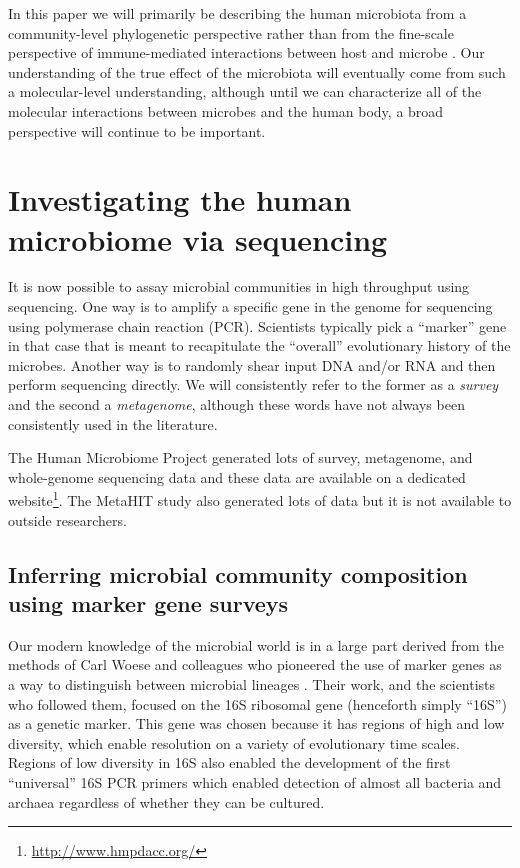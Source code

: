\documentclass{amsart}
\begin{document}
In this paper we will primarily be describing the human microbiota from a community-level phylogenetic perspective rather than from the fine-scale perspective of immune-mediated interactions between host and microbe \citep[reviewed in][]{hooper2012interactions}.
Our understanding of the true effect of the microbiota will eventually come from such a molecular-level understanding, although until we can characterize all of the molecular interactions between microbes and the human body, a broad perspective will continue to be important.


\section{Investigating the human microbiome via sequencing}
It is now possible to assay microbial communities in high throughput using sequencing.
One way is to amplify a specific gene in the genome for sequencing using polymerase chain reaction (PCR).
Scientists typically pick a ``marker'' gene in that case that is meant to recapitulate the ``overall'' evolutionary history of the microbes.
Another way is to randomly shear input DNA and/or RNA and then perform sequencing directly.
We will consistently refer to the former as a \textit{survey} and the second a \textit{metagenome}, although these words have not always been consistently used in the literature.

The Human Microbiome Project \citep{methe2012framework} generated lots of survey, metagenome, and whole-genome sequencing data and these data are available on a dedicated website\footnote{\url{http://www.hmpdacc.org/}}.
The MetaHIT study \citep{qin2010human} also generated lots of data but it is not available to outside researchers.

\subsection{Inferring microbial community composition using marker gene surveys}
Our modern knowledge of the microbial world is in a large part derived from the methods of Carl Woese and colleagues who pioneered the use of marker genes as a way to distinguish between microbial lineages \citep{fox1977comparative}.
Their work, and the scientists who followed them, focused on the 16S ribosomal gene (henceforth simply ``16S'') as a genetic marker.
This gene was chosen because it has regions of high and low diversity, which enable resolution on a variety of evolutionary time scales.
Regions of low diversity in 16S also enabled the development of the first ``universal'' 16S PCR primers \citep{lane1985rapid} which enabled detection of almost all bacteria and archaea regardless of whether they can be cultured.
\end{document}
